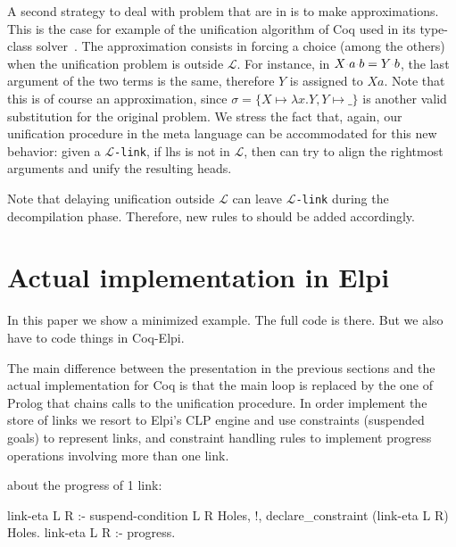 \documentclass[sigconf,natbib=false,review]{acmart}
\newcommand{\appsep}{\ensuremath{\textcolor{lightgray}{\cdot}}}
\newcommand{\llambda}{\ensuremath{\mathcal{L}}\xspace}
\newcommand{\linkMacro}[1]{\ensuremath{#1}\texttt{-link}\xspace}
\newcommand{\linkbeta}{\linkMacro{\llambda}}
\newcommand{\lhs}{lhs\xspace}
\begin{document}
A second strategy to deal with problem that are in \notllambda is to make
approximations. This is the case for example of the unification algorithm of Coq
used in its type-class solver~\cite{sozeau08}. The approximation consists in
forcing a choice (among the others) when the unification problem is outside
\llambda. For instance, in $X \appsep a \appsep b = Y \appsep b$, the last
argument of the two terms is the same, therefore $Y$ is assigned to $X a$. Note
that this is of course an approximation, since $\sigma = \{X \mapsto \lambda x.Y, Y \mapsto
\_\}$ is another valid substitution for the original problem. We stress the 
fact that, again, our unification procedure in the meta language can be 
accommodated for this new behavior: given a \linkbeta, if \lhs is not in \llambda,
then  can try to align the rightmost arguments and unify
the resulting heads. 

Note that delaying unification outside \llambda can leave \linkbeta during the
decompilation phase. Therefore, new rules to  should
be added accordingly.



\section{Actual implementation in Elpi}\label{sec:implementation}

In this paper we show a minimized example. The full code is there.
But we also have to code things in Coq-Elpi.

The main difference between the presentation in the previous sections and
the actual implementation for Coq is that the main loop \hrun is replaced by
the one of Prolog that chains calls to the unification procedure. In order
implement the store of links we resort to Elpi's CLP engine and
use constraints (suspended goals) to represent links, and constraint
handling rules to implement progress operations involving more than one link.

about the progress of 1 link:

\begin{elpicode}
link-eta L R :- suspend-condition L R Holes, !,
  declare_constraint (link-eta L R) Holes.
link-eta L R :-
  progress. %
\end{elpicode}
\end{document}
